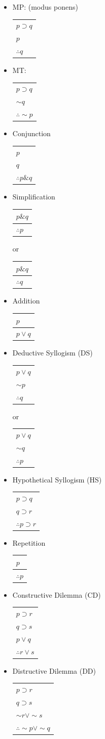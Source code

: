 \documentclass[11pt, fleqn]{article}
\newcommand{\argument}[2]{\begin{tabular}{p{#1 cm}} #2 \end{tabular}}
\begin{document}
 \begin{itemize}
     \item MP: (modus ponens)\\
     \argument{1}{$p\supset q$\\ $p$\\ \hline $\therefore q$}
     \item MT:\\
     \argument{1}{$p\supset q$\\ $\sim q$\\ \hline $\therefore \sim p$}
     \item Conjunction\\
     \argument{1}{$p$\\$q$\\ \hline $\therefore p\& q$}
     \item Simplification\\
     \argument{1}{$p\& q$\\ \hline $\therefore p$} or \argument{1}{$p\& q$\\ \hline $\therefore q$}
     \item Addition\\
     \argument{1}{$p$\\ \hline $p\vee q$}
     \item Deductive Syllogism (DS)\\
     \argument{1}{$p\vee q$\\ $\sim p$\\ \hline $\therefore q$} or \argument{1}{$p\vee q$\\ $\sim q$\\ \hline $\therefore p$}
     \item Hypothetical Syllogism (HS)\\
     \argument{2}{$p\supset q$\\ $q\supset r$\\ \hline $\therefore p\supset r$}
     \item Repetition\\
     \argument{1}{$p$\\ \hline $\therefore p$}
     \item Constructive Dilemma (CD)\\
     \argument{2}{$p\supset r$\\ $q\supset s$\\ $p\vee q$\\ \hline $\therefore r\vee s$}
     \item Distructive Dilemma (DD)\\
     \argument{2}{$p\supset r$\\ $q\supset s$\\ $\sim r\vee \sim s$\\ \hline $\therefore \sim p\vee \sim q$}
 \end{itemize}
\end{document}
